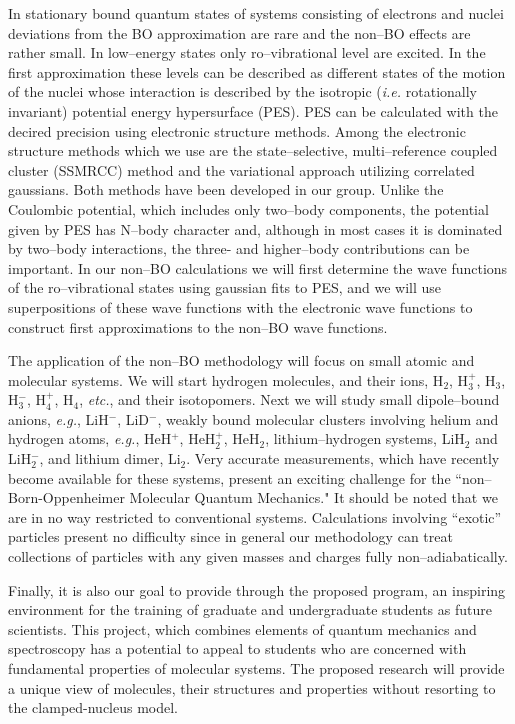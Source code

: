 In 
stationary bound
quantum states of 
systems 
consisting of electrons and nuclei
deviations from the BO approximation
are rare and the non--BO effects
are rather small. 
In low--energy states only  
ro--vibrational level are excited.
In the first approximation  these levels can be
described as different states of the motion
of the nuclei whose interaction is described by the
isotropic ({\it i.e.} rotationally invariant)
potential energy hypersurface (PES).
PES can be calculated with the decired precision using
electronic structure methods.
Among the electronic structure methods which we
use are
the state--selective, multi--reference coupled cluster (SSMRCC)
method and the variational approach utilizing correlated gaussians.
Both methods have been developed in our group. 
Unlike the Coulombic potential, which includes only two--body
components, the potential given by PES has N--body character and,
although in most cases it is dominated by two--body interactions,
the three- and higher--body contributions can be important.
In our non--BO calculations we will first determine the
wave functions of the ro--vibrational states using
gaussian fits to PES, and we will use superpositions
of these wave functions with the electronic wave functions
to construct first approximations to the non--BO wave functions.


The application of the non--BO 
methodology 
will focus on
small atomic and molecular systems.
We will start
hydrogen molecules, and their ions,
H$_2$, H$_3^+$, H$_3$, H$_3^-$, H$_4^+$, H$_4$, {\it etc.},
and their isotopomers. Next we will study    
small dipole--bound anions, {\it e.g.}, LiH$^-$, LiD$^-$,
weakly bound molecular clusters involving 
helium and hydrogen atoms, {\it e.g.}, HeH$^+$, HeH$_2^+$, HeH$_2$,
lithium--hydrogen systems, LiH$_2$ and LiH$_2^-$,
and lithium dimer, Li$_2$.  
Very accurate measurements, which have 
recently become
available 
for these systems,
present an exciting challenge for 
the ``non--Born-Oppenheimer Molecular Quantum Mechanics."
It should be noted 
that we are in no way restricted to conventional systems.
Calculations involving ``exotic'' particles present no difficulty 
since in general our methodology can treat collections of particles
with any given masses and charges fully non--adiabatically.  
 

Finally, it is also our goal to
provide through the proposed program, an inspiring environment 
for the training of graduate and undergraduate students as
future scientists. This project, which combines elements of 
quantum mechanics and spectroscopy has a potential to appeal
to students who are 
concerned with 
fundamental properties of molecular systems.
The proposed research will provide a unique view of molecules,
their structures and properties without resorting to
the clamped-nucleus model.


